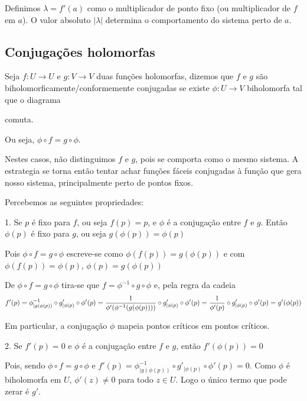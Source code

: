 \documentclass{article}
\begin{document}
Definimos $\lambda = f'(a)$ como o multiplicador de ponto fixo (ou multiplicador de $f$ em $a$). O valor absoluto $|\lambda|$ determina o comportamento do sistema perto de $a$.

\subsection*{Conjugações holomorfas}

Seja $f: U \to U$ e $g: V \to V$ duas funções holomorfas, dizemos que $f$ e $g$ são biholomorficamente/conformemente conjugadas se existe $\phi: U \to V$ biholomorfa tal que o diagrama


comuta.

Ou seja, $\phi \circ f = g \circ \phi $.

Nestes casos, não distinguimos $f$ e $g$, pois se comporta como o mesmo sistema. A estrategia se torna então tentar achar funções fáceis conjugadas à função que gera nosso sistema, principalmente perto de pontos fixos.

Percebemos as seguintes propriedades:

1. Se $p$ é fixo para $f$, ou seja $f(p) = p$, e $\phi$ é a conjugação entre $f$ e $g$. Então $\phi(p)$ é fixo para $g$, ou seja $g(\phi(p)) = \phi(p)$

Pois $\phi \circ f = g \circ \phi $ escreve-se como $\phi(f(p)) = g(\phi(p))$ e com $\phi(f(p))  =\phi(p)$, $\phi(p) = g(\phi(p))$

De $\phi \circ f = g \circ \phi$ tira-se que  $f = \phi^{-1} \circ  g \circ \phi$ e, pela regra da cadeia $$f'(p) = \phi^{-1}_{|g(\phi(p))} \circ  g'_{|\phi(p)} \circ \phi'(p) = \\ \frac{1}{\phi'(\phi^{-1}(g(\phi(p))))}  \circ  g'_{|\phi(p)} \circ \phi'(p) = \frac{1}{\phi'(p)}  \circ  g'_{|\phi(p)} \circ \phi'(p) = g'(\phi(p))$$

Em particular, a conjugação $\phi$ mapeia pontos críticos em pontos críticos.

2. Se $f'(p) = 0$ e $\phi$ é a conjugação entre $f$ e $g$, então $f'(\phi(p)) = 0$

Pois, sendo $\phi \circ f = g \circ \phi$ e $f'(p) = \phi^{-1}_{|g(\phi(p))} \circ  g'_{|\phi(p)} \circ \phi'(p) = 0$. Como $\phi$ é biholomorfa em $U$, $\phi'(z) \neq 0$ para todo $z \in U$. Logo o único termo que pode zerar é $g'$. 
\end{document}
